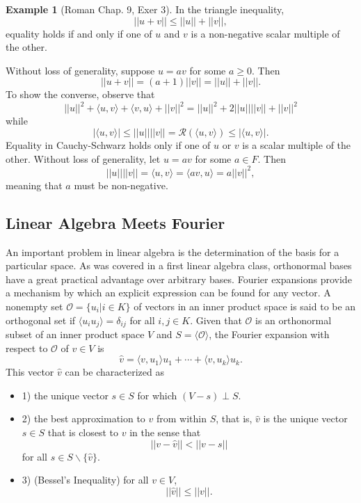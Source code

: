 \documentclass{article}
\theoremstyle{definition}
\newtheorem{exmp}[thm]{Example}
\theoremstyle{remark}
\numberwithin{equation}{section}
\begin{document}
\begin{exmp}[Roman Chap. 9, Exer 3]
In the triangle inequality, 
$$|| u + v || \leq ||u || + || v||, $$
equality holds if and only if one of $u$ and $v$ is a non-negative scalar multiple of the other. 

Without loss of generality, suppose $u = av$ for some $a \geq 0$. Then 
$$||u+v|| = (a+1)||v|| = ||u|| + ||v||.$$
To show the converse, observe that 
$$||u||^2 + \langle u, v \rangle + \langle v, u \rangle + ||v||^2 = ||u||^2 + 2 ||u|| ||v|| + ||v||^2 $$
while 
$$|\langle u, v \rangle | \leq || u || || v|| = \mathcal{R} (\langle u, v \rangle ) \leq | \langle u , v \rangle |.$$
Equality in Cauchy-Schwarz holds only if one of $u$ or $v$ is a scalar multiple of the other. Without loss of generality, let $u = av$ for some $a \in F$. Then 
$$||u|| || v|| = \langle u, v \rangle = \langle av, u \rangle = a || v||^2, $$
meaning that $a$ must be non-negative. 
\end{exmp}


\subsection{Linear Algebra Meets Fourier} An important problem in linear algebra is the determination of the basis for a particular space. As was covered in a first linear algebra class, orthonormal bases have a great practical advantage over arbitrary bases. Fourier expansions provide a mechanism by which an explicit expression can be found for any vector. A nonempty set $\mathcal{O} = \{ u_i | i \in K \}$ of vectors in an inner product space is said to be an orthogonal set if $\langle u_i u_j \rangle = \delta _{ij}$ for all $i, j \in K$. Given that $\mathcal{O}$ is an orthonormal subset of an inner product space $V$ and $S = \langle \mathcal{O} \rangle$, the Fourier expansion with respect to $\mathcal{O}$ of $v \in V$ is 
$$\hat{v} = \langle v, u_1 \rangle u_1 + \cdots + \langle v, u_k \rangle u_k .$$
This vector $\hat{v}$ can be characterized as  
\begin{itemize}
    \item 1) the unique vector $s \in S$ for which $(V-s) \perp S$. 
    \item 2)  the best approximation to $v$ from within $S$, that is, $\hat{v}$ is the unique vector $s \in S$ that is closest to $v$ in the sense that 
    $$|| v - \hat{v} || < ||v - s || $$
    for all $s \in S \backslash \{ \hat{v} \}.$
    \item 3) (Bessel's Inequality) for all $v \in V$, 
    $$||\hat{v} || \leq || v ||.  $$
\end{itemize}
\end{document}
